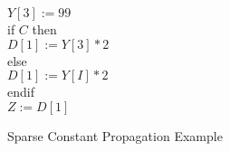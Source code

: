 


\begin{figure}%

\begin{center}
\parbox{3.0in}{
\begin{programa}
\Ta $Y[3] := 99$ \\
\Ta if $C$ then \\
\Tb   $D[1] := Y[3] * 2$ \\
\Ta else \\
\Tb   $D[1] := Y[I] * 2$ \\
\Ta endif \\
\Ta $Z := D[1]$ 
\end{programa}
}
\end{center}
\caption{Sparse Constant Propagation Example}
\label{fig:sc-ex-source}
\end{figure}

